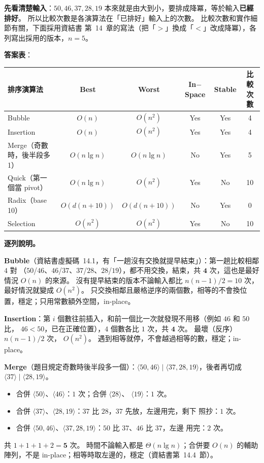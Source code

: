 \begin{pastsoln}
\textbf{先看清楚輸入}：$50, 46, 37, 28, 19$ 本來就是由大到小，要排成降冪，等於輸入\textbf{已經排好}。
所以比較次數是各演算法在「已排好」輸入上的次數。 比較次數和實作細節有關，下面採用資結書
第~14~章的寫法（把「$>$」換成「$<$」改成降冪），各列寫出採用的版本，$n = 5$。

\textbf{答案表}：
\begin{center}
\small
\begin{tabular}{|p{2.6cm}|c|c|c|c|c|}
\hline
排序演算法 & Best & Worst & In$-$Space & Stable & 比較次數 \\ \hline
Bubble & $O(n)$ & $O(n^2)$ & Yes & Yes & 4 \\ \hline
Insertion & $O(n)$ & $O(n^2)$ & Yes & Yes & 4 \\ \hline
Merge（奇數時，後半段多 1） & $O(n \lg n)$ & $O(n \lg n)$ & No & Yes & 5 \\ \hline
Quick（第一個當 pivot） & $O(n \lg n)$ & $O(n^2)$ & Yes & No & 10 \\ \hline
Radix（base 10） & $O(d(n + 10))$ & $O(d(n + 10))$ & No & Yes & 0 \\ \hline
Selection & $O(n^2)$ & $O(n^2)$ & Yes & No & 10 \\ \hline
\end{tabular}
\end{center}

\textbf{逐列說明。}

\textbf{Bubble}（資結書虛擬碼~14.1，有「一趟沒有交換就提早結束」）：第一趟比較相鄰 $4$ 對
（$50$/$46$、$46$/$37$、$37$/$28$、$28$/$19$），都不用交換，結束，共 $\mathbf{4}$ 次，這也是最好
情況 $O(n)$ 的來源。 沒有提早結束的版本不論輸入都比 $n(n-1)/2 = 10$ 次，最好情況就變成 $O(n^2)$。
只交換相鄰且嚴格逆序的兩個數，相等的不會換位置，穩定；只用常數額外空間，in-place。

\textbf{Insertion}：第 $i$ 個數往前插入，和前一個比一次就發現不用移（例如 $46$ 和 $50$ 比，
$46 < 50$，已在正確位置），$4$ 個數各比 $1$ 次，共 $\mathbf{4}$ 次。 最壞（反序）$n(n-1)/2$ 次，
$O(n^2)$。 遇到相等就停，不會越過相等的數，穩定；in-place。

\textbf{Merge}（題目規定奇數時後半段多一個）：$\langle 50, 46 \rangle \mid \langle 37, 28, 19
\rangle$，後者再切成 $\langle 37 \rangle \mid \langle 28, 19 \rangle$。
\begin{itemize}[nosep]
\item 合併 $\langle 50 \rangle$、$\langle 46 \rangle$：$1$ 次；合併 $\langle 28 \rangle$、
$\langle 19 \rangle$：$1$ 次。
\item 合併 $\langle 37 \rangle$、$\langle 28, 19 \rangle$：$37$ 比 $28$，$37$ 先放，左邊用完，剩下
照抄：$1$ 次。
\item 合併 $\langle 50, 46 \rangle$、$\langle 37, 28, 19 \rangle$：$50$ 比 $37$、$46$ 比 $37$，左邊
用完：$2$ 次。
\end{itemize}
共 $1 + 1 + 1 + 2 = \mathbf{5}$ 次。 時間不論輸入都是 $\Theta(n \lg n)$；合併要 $O(n)$ 的輔助
陣列，不是 in-place；相等時取左邊的，穩定（資結書第~14.4~節）。


\end{pastsoln}
